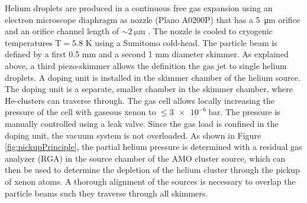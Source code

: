 Helium droplets are produced in a continuous free gas expansion using an electron microscope diaphragm as nozzle (Plano A0200P) that has a \SI{5}{\micro\meter} orifice and an orifice channel length of $\sim\SI{2}{\micro\meter}$ \citep{Gomez-2011-JCP}. The nozzle is cooled to cryogenic temperatures $\text{T}= 5.8$ K using a Sumitomo cold-head. The particle beam is defined by a first 0.5 mm and a second 1 mm diameter skimmer. As explained above, a third piezo-skimmer allows the definition the gas jet to single helium droplets. A doping unit is installed in the skimmer chamber of the helium source. The doping unit is a separate, smaller chamber in the skimmer chamber, where He-clusters can traverse through. The gas cell allows locally increasing the pressure of the cell with gaseous xenon to $\leq \SI{3e-6}{\bar}$. The pressure is manually controlled using a leak valve. Since the gas load is confined in the doping unit, the vacuum system is not overloaded. As shown in Figure \ref{fig:pickupPrinciple}, the partial helium pressure is determined with a residual gas analyzer (RGA) in the source chamber of the AMO cluster source, which can then be used to determine the depletion of the helium cluster through the pickup of xenon atoms. A thorough alignment of the sources is necessary to overlap the particle beams such they traverse through all skimmers.%
%
%
%
